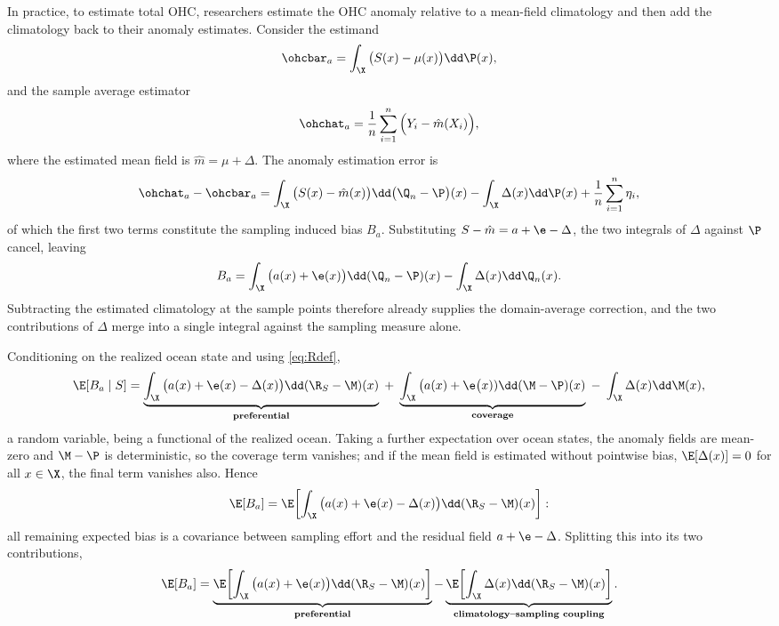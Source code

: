 In practice, to estimate total OHC, researchers estimate the OHC anomaly
relative to a mean-field climatology and then add the climatology back to their
anomaly estimates. Consider the estimand
\begin{equation}
  \ohcbar_a = \int_{\X} \big(S(x) - \mu(x)\big) \dd \P(x),
\end{equation}
and the sample average estimator
\begin{equation}
  \ohchat_a = \frac1n \sum_{i=1}^{n}\Big(Y_i - \hat m(X_i)\Big),
\end{equation}
where the estimated mean field is $\hat m = \mu + \Delta$. The anomaly
estimation error is
\begin{equation}
  \ohchat_a - \ohcbar_a
  = \int_\X \big(S(x) - \hat m(x)\big) \dd\big(\Q_n - \P\big)(x)
  - \int_\X \Delta(x) \dd\P(x)
  + \frac1n\sum_{i=1}^{n}\eta_i ,
\end{equation}
of which the first two terms constitute the sampling induced bias $B_a$.
Substituting $S - \hat m = a + \e - \Delta$, the two integrals of $\Delta$
against $\P$ cancel, leaving
\begin{equation}
  \label{eq:Bacollapse}
  B_a = \int_\X \big(a(x) + \e(x)\big)\dd(\Q_n - \P)(x)
        - \int_\X \Delta(x)\dd\Q_n(x) .
\end{equation}
Subtracting the estimated climatology at the sample points therefore already
supplies the domain-average correction, and the two contributions of $\Delta$
merge into a single integral against the sampling measure alone.

Conditioning on the realized ocean state and using \eqref{eq:Rdef},
\begin{equation}
  \label{eq:condbiasanom}
  \E[B_a \mid S]
  = \underbrace{\int_\X \big(a(x) + \e(x) - \Delta(x)\big)\dd(\R_S - \M)(x)}_{\textbf{preferential}}
  \;+\; \underbrace{\int_\X \big(a(x) + \e\big(x))\dd(\M - \P)(x)}_{\textbf{coverage}}
  \;-\; \int_\X \Delta(x) \dd\M(x) ,
\end{equation}
a random variable, being a functional of the realized ocean. Taking a further
expectation over ocean states, the anomaly fields are mean-zero and $\M - \P$ is
deterministic, so the coverage term vanishes; and if the mean field is estimated
without pointwise bias, $\E[\Delta(x)] = 0$ for all $x \in \X$, the final term
vanishes also. Hence
\begin{equation}
  \label{eq:Baresidual}
  \E[B_a]
  = \E\!\left[\int_\X \big(a(x)+\e(x)-\Delta(x)\big)\dd(\R_S - \M)(x)\right] :
\end{equation}
all remaining expected bias is a covariance between sampling effort and the
residual field $a + \e - \Delta$. Splitting this into its two contributions,
\begin{equation}
  \label{eq:biasdecompanom}
  \E[B_a]
  = \underbrace{\E\!\left[\int_\X \big(a(x)+\e(x)\big)\dd(\R_S - \M)(x)\right]}_{\textbf{preferential}}
  - \underbrace{\E\!\left[\int_\X \Delta(x)\dd(\R_S - \M)(x)\right]}_{\textbf{climatology--sampling coupling}} .
\end{equation}

